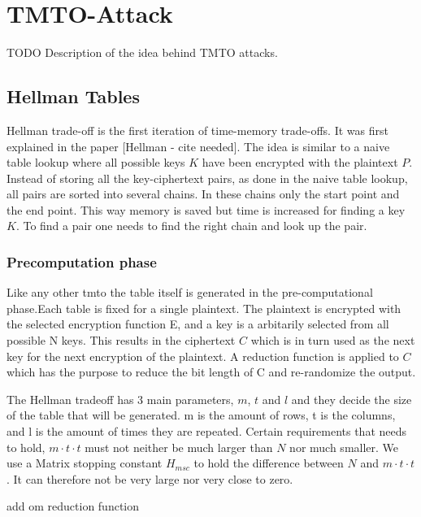 \chapter{TMTO-Attack}

\label{ch:tmto}
TODO Description of the idea behind TMTO attacks.
\newpage
\section{Hellman Tables}
\label{sec:hmtheory}
Hellman trade-off is the first iteration of time-memory trade-offs. It
was first explained in the paper [Hellman - cite needed].
The idea is similar to a naive table lookup where all possible keys $K$ have been encrypted with the plaintext $P$.
Instead of storing all the key-ciphertext pairs, as done in the naive
table lookup, all pairs are sorted into several chains. In these
chains only the start point and the end point. This way memory is
saved but time is increased for finding a key $K$. To find a pair one
needs to find the right chain and look up the pair.

\subsection{Precomputation phase} %
Like any other tmto the table itself is generated in the pre-computational phase.Each table is fixed for a single plaintext. The plaintext is encrypted with the selected encryption function E, and a key is a arbitarily selected from all possible N keys. This results in the ciphertext $C$ which is in turn used as the next key for the next encryption of the plaintext. A reduction function is applied to $C$ which has the purpose to reduce the bit length of C and re-randomize the output.

The Hellman tradeoff has 3 main parameters, $m$, $t$ and $l$ and they decide the size of the table that will be generated.
m is the amount of rows, t is the columns, and l is the amount of times they are repeated.
Certain requirements that needs to hold, $m\cdot t\cdot t$ must not neither be much larger than $N$ nor much smaller. We use a Matrix stopping constant $H_{msc}$ to hold the difference between $N$ and $m\cdot t\cdot t$. It can therefore not be very large nor very close to zero.

add om reduction function

